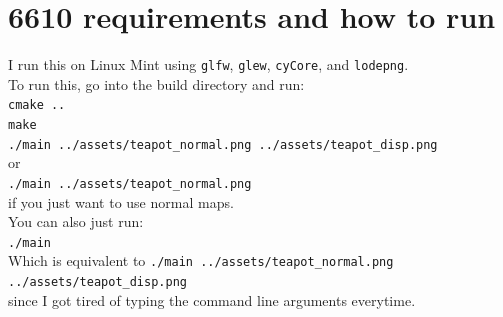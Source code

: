 \documentclass{article}
\begin{document}
\section*{6610 requirements and how to run}
I run this on Linux Mint using \texttt{glfw}, \texttt{glew}, \texttt{cyCore}, and \texttt{lodepng}.\\
To run this, go into the build directory and run:\\
\texttt{cmake ..}\\
\texttt{make}\\
\texttt{./main ../assets/teapot\_normal.png ../assets/teapot\_disp.png}\\
or\\
\texttt{./main ../assets/teapot\_normal.png}\\
if you just want to use normal maps.\\[2mm]
You can also just run:\\
\texttt{./main}\\
Which is equivalent to \texttt{./main ../assets/teapot\_normal.png ../assets/teapot\_disp.png}\\
since I got tired of typing the command line arguments everytime.
\end{document}
